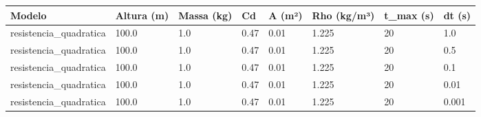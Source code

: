 \begin{tabular}{llllllll}
\toprule
Modelo & Altura (m) & Massa (kg) & Cd & A (m²) & Rho (kg/m³) & t\_max (s) & dt (s) \\
\midrule
resistencia\_quadratica & 100.0 & 1.0 & 0.47 & 0.01 & 1.225 & 20 & 1.0 \\
resistencia\_quadratica & 100.0 & 1.0 & 0.47 & 0.01 & 1.225 & 20 & 0.5 \\
resistencia\_quadratica & 100.0 & 1.0 & 0.47 & 0.01 & 1.225 & 20 & 0.1 \\
resistencia\_quadratica & 100.0 & 1.0 & 0.47 & 0.01 & 1.225 & 20 & 0.01 \\
resistencia\_quadratica & 100.0 & 1.0 & 0.47 & 0.01 & 1.225 & 20 & 0.001 \\
\bottomrule
\end{tabular}
